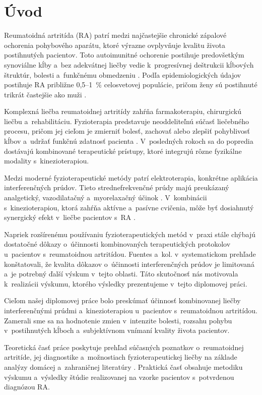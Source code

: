 
\chapter*{Úvod}

Reumatoidná artritída (RA) patrí medzi najčastejšie chronické zápalové ochorenia pohybového aparátu, ktoré výrazne ovplyvňuje kvalitu života postihnutých pacientov. Toto autoimunitné ochorenie postihuje predovšetkým synoviálne kĺby a~bez adekvátnej liečby vedie k~progresívnej deštrukcii kĺbových štruktúr, bolesti a~funkčnému obmedzeniu \parencite{smolen2018}. Podľa epidemiologických údajov postihuje RA približne 0,5--1~\% celosvetovej populácie, pričom ženy sú postihnuté trikrát častejšie ako muži \parencite{firestein2021}.

Komplexná liečba reumatoidnej artritídy zahŕňa farmakoterapiu, chirurgickú liečbu a~rehabilitáciu. Fyzioterapia predstavuje neoddeliteľnú súčasť liečebného procesu, pričom jej cieľom je zmierniť bolesť, zachovať alebo zlepšiť pohyblivosť kĺbov a~udržať funkčnú zdatnosť pacienta \parencite{Kolar2012}. V~posledných rokoch sa do popredia dostávajú kombinované terapeutické prístupy, ktoré integrujú rôzne fyzikálne modality s~kinezioterapiou.

Medzi moderné fyzioterapeutické metódy patrí elektroterapia, konkrétne aplikácia interferenčných prúdov. Tieto strednefrekvenčné prúdy majú preukázaný analgetický, vazodilatačný a~myorelaxačný účinok \parencite{Rampazo2022}. V~kombinácii s~kinezioterapiou, ktorá zahŕňa aktívne a~pasívne cvičenia, môže byť dosiahnutý synergický efekt v~liečbe pacientov s~RA \parencite{Herbert2022}.

Napriek rozšírenému používaniu fyzioterapeutických metód v~praxi stále chýbajú dostatočné dôkazy o~účinnosti kombinovaných terapeutických protokolov u~pacientov s~reumatoidnou artritídou. Fuentes a~kol. \parencite*{Fuentes2010} v~systematickom prehľade konštatovali, že kvalita dôkazov o~účinnosti interferenčných prúdov je limitovaná a~je potrebný ďalší výskum v~tejto oblasti. Táto skutočnosť nás motivovala k~realizácii výskumu, ktorého výsledky prezentujeme v~tejto diplomovej práci.

Cieľom našej diplomovej práce bolo preskúmať účinnosť kombinovanej liečby interferenčnými prúdmi a~kinezioterapiou u~pacientov s~reumatoidnou artritídou. Zamerali sme sa na hodnotenie zmien v~intenzite bolesti, rozsahu pohybu v~postihnutých kĺboch a~subjektívnom vnímaní kvality života pacientov.

Teoretická časť práce poskytuje prehľad súčasných poznatkov o~reumatoidnej artritíde, jej diagnostike a~možnostiach fyzioterapeutickej liečby na základe analýzy domácej \parencite{Macejova2019, Podebradsky2009} a~zahraničnej literatúry \parencite{Watson2020, smolen2018}. Praktická časť obsahuje metodiku výskumu a~výsledky štúdie realizovanej na vzorke pacientov s~potvrdenou diagnózou RA.

\clearpage
